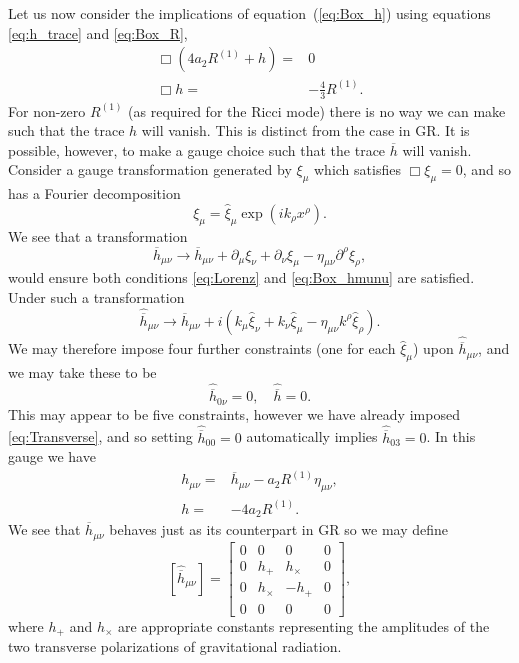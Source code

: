 \documentclass[a4paper, 11pt, titlepage, twoside]{report}
\newcommand{\eqnref}[1]{equation~(\ref{eq:#1})}
\begin{document}
Let us now consider the implications of \eqnref{Box_h} using equations \eqref{eq:h_trace} and \eqref{eq:Box_R},
\begin{align}
\Box\left(4a_2R^{(1)} + h\right) = {} & 0 \nonumber \\
\Box h = {} & -\frac{4}{3}R^{(1)}.
\end{align}
For non-zero $R^{(1)}$ (as required for the Ricci mode) there is no way we can make such that the trace $h$ will vanish\cite{Corda2007, Capozziello2008}. This is distinct from the case in GR. It is possible, however, to make a gauge choice such that the trace $\overline{h}$ will vanish. Consider a gauge transformation generated by $\xi_\mu$ which satisfies $\Box \xi_\mu = 0$, and so has a Fourier decomposition
\begin{equation}
\xi_\mu = \widehat{\xi}_\mu \exp\left(ik_\rho x^\rho\right).
\end{equation}
We see that a transformation
\begin{equation}
\overline{h}_{\mu\nu} \rightarrow \overline{h}_{\mu\nu} + \partial_\mu\xi_\nu + \partial_\nu\xi_\mu - \eta_{\mu\nu}\partial^\rho\xi_\rho,
\end{equation}
would ensure both conditions \eqref{eq:Lorenz} and \eqref{eq:Box_hmunu} are satisfied\cite{Misner1973}. Under such a transformation
\begin{equation}
\widehat{\overline{h}}_{\mu\nu} \rightarrow \widehat{\overline{h}}_{\mu\nu} + i\left(k_\mu\widehat{\xi}_\nu + k_\nu\widehat{\xi}_\mu - \eta_{\mu\nu}k^\rho\widehat{\xi}_\rho\right).
\end{equation}
We may therefore impose four further constraints (one for each $\widehat{\xi}_\mu$) upon $\widehat{\overline{h}}_{\mu\nu}$, and we may take these to be
\begin{equation}
\widehat{\overline{h}}_{0\nu} = 0, \quad \widehat{\overline{h}} = 0.
\end{equation}
This may appear to be five constraints, however we have already imposed \eqref{eq:Transverse}, and so setting $\widehat{\overline{h}}_{00} = 0$ automatically implies $\widehat{\overline{h}}_{03} = 0$. In this gauge we have
\begin{align}
h_{\mu\nu} = {} & \overline{h}_{\mu\nu} - a_2 R^{(1)}\eta_{\mu\nu},\\
h = {} & -4a_2R^{(1)}.
\label{eq:gauge}
\end{align}
We see that $\overline{h}_{\mu\nu}$ behaves just as its counterpart in GR so we may define
\begin{equation}
\left[\widehat{\overline{h}}_{\mu\nu}\right] =
\begin{bmatrix}
0 & 0 & 0 & 0\\
0 & h_+ & h_\times & 0\\
0 & h_\times & -h_+ & 0\\
0 & 0 & 0 & 0
\end{bmatrix},
\end{equation}
where $h_+$ and $h_\times$ are appropriate constants representing the amplitudes of the two transverse polarizations of gravitational radiation.
\end{document}
